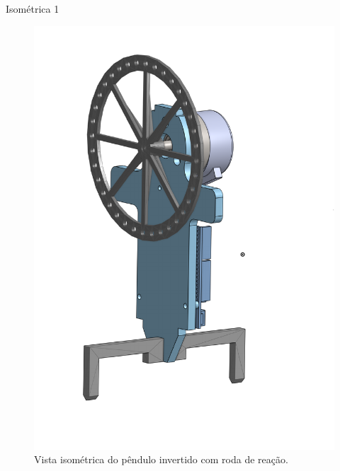 \begin{frame}{Isométrica 1}
    \begin{figure}
        \centering
        \includegraphics[height=0.8\textheight]{iso1.pdf}
        \caption{Vista isométrica do pêndulo invertido com roda de reação.}
        \label{fig:iso1}
    \end{figure}
\end{frame}

